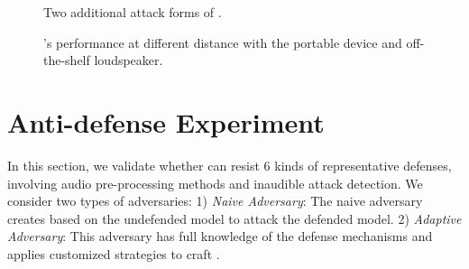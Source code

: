 \begin{figure}[t]
	\centering  %
        \hfill
	\caption{Two additional attack forms of \alias.}    %
	\label{fig:portable_device}    %
	\vspace{-10pt}
\end{figure}


\begin{figure}[t]
	\centering  %
        \hfill
	\caption{\alias's performance at different distance with the portable device and off-the-shelf loudspeaker.}    %
	\label{fig:eval_portable_hivi}    %
	\vspace{-10pt}
\end{figure}

\section{Anti-defense Experiment}
In this section, we validate whether \alias can resist 6 kinds of representative defenses, involving audio pre-processing methods and inaudible attack detection. We consider two types of adversaries: 1) \emph{Naive Adversary}: The naive adversary creates \alias based on the undefended model to attack the defended model. 2) \emph{Adaptive Adversary}: This adversary has full knowledge of the defense mechanisms and applies customized strategies to craft \alias.

